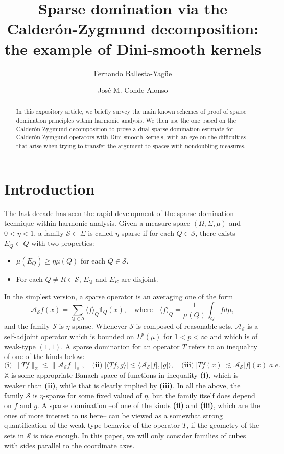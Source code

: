 \documentclass[12pt]{amsart}
\title[Sparse via Calder\'on-Zygmund: Dini kernels]{Sparse domination via the Calder\'on-Zygmund decomposition: the example of Dini-smooth kernels}
\author[F. Ballesta-Yag\"ue]{Fernando Ballesta-Yag\"ue}
\author[J.M. Conde Alonso]{Jos\'e M. Conde-Alonso}
\newcommand{\one}{\mathds{1}}
\newcommand{\Ss}{\mathcal{S}}
\newcommand{\AS}{\mathcal{A}_{\Ss}}
\theoremstyle{plain}
\theoremstyle{definition} %
\numberwithin{equation}{section}
\begin{document}
\begin{abstract}
    In this expository article, we briefly survey the main known schemes of proof of sparse domination principles within harmonic analysis. We then use the one based on the Calder\'on-Zygmund decomposition to prove a dual sparse domination estimate for Calder\'on-Zymgund operators with Dini-smooth kernels, with an eye on the difficulties that arise when trying to transfer the argument to spaces with nondoubling measures. 
\end{abstract}

\maketitle

\section*{Introduction}

The last decade has seen the rapid development of the sparse domination technique within harmonic analysis. Given a measure space $(\Omega,\Sigma,\mu)$ and $0<\eta<1$, a family $\Ss\subset \Sigma$ is called $\eta$-sparse if for each $Q \in \Ss$, there exists $E_Q \subset Q$ with two properties:
\begin{itemize}
    \item $\mu(E_Q) \geq \eta \mu(Q)$ for each $Q\in\Ss$.
    \item For each $Q\neq R \in \Ss$, $E_Q$ and $E_R$ are disjoint.
\end{itemize}
In the simplest version, a sparse operator is an averaging one of the form 
$$
\AS f(x) = \sum_{Q\in \Ss} \langle f \rangle_Q \one_Q(x), \quad \mbox{where} \quad \langle f \rangle_Q = \frac{1}{\mu(Q)}\int_Q f d\mu,
$$
and the family $\Ss$ is $\eta$-sparse. Whenever $\Ss$ is composed of reasonable sets, $\AS$ is a self-adjoint operator which is bounded on $L^p(\mu)$ for $1<p<\infty$ and which is of weak-type $(1,1)$. A sparse domination for an operator $T$ refers to an inequality of one of the kinds below:
$$
\textbf{(i)} \;\|Tf\|_{\mathbb{X}} \lesssim \|\AS f\|_{\mathbb{X}}, \quad \textbf{(ii)} \;\left|\langle Tf,g\rangle\right| \lesssim \langle \AS |f|,|g|\rangle, \quad \textbf{(iii)} \;|Tf(x)| \lesssim \AS |f|(x) \; a.e.
$$
$\mathbb{X}$ is some appropriate Banach space of functions in inequality \textbf{(i)}, which is weaker than \textbf{(ii)}, while that is clearly implied by \textbf{(iii)}. In all the above, the family $\Ss$ is $\eta$-sparse for some fixed valued of $\eta$, but the family itself does depend on $f$ and $g$. A sparse domination --of one of the kinds \textbf{(ii)} and \textbf{(iii)}, which are the ones of more interest to us here-- can be viewed as a somewhat strong quantification of the weak-type behavior of the operator $T$, if the geometry of the sets in $\Ss$ is nice enough. In this paper, we will only consider families of cubes with sides parallel to the coordinate axes.
\end{document}
